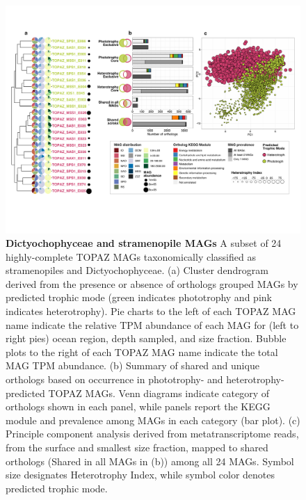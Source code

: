 \documentclass[12pt]{article}
\numberwithin{equation}{section}
\begin{document}
\begin{figure}[h!]    
    \centering
    \includegraphics[width = \columnwidth]{figures/Figure5-panel-plot-stramenopile-H.png}
    \caption{ \textbf{Dictyochophyceae and stramenopile MAGs} A subset of 24 highly-complete TOPAZ MAGs taxonomically classified as stramenopiles and Dictyochophyceae. (a) Cluster dendrogram derived from the presence or absence of orthologs grouped MAGs by predicted trophic mode (green indicates phototrophy and pink indicates heterotrophy). Pie charts to the left of each TOPAZ MAG name indicate the relative TPM abundance of each MAG for (left to right pies) ocean region, depth sampled, and size fraction. Bubble plots to the right of each TOPAZ MAG name indicate the total MAG TPM abundance. (b) Summary of shared and unique orthologs based on occurrence in phototrophy- and heterotrophy-predicted TOPAZ MAGs. Venn diagrams indicate category of orthologs shown in each panel, while panels report the KEGG module and prevalence among MAGs in each category (bar plot). (c) Principle component analysis derived from metatranscriptome reads, from the surface and smallest size fraction, mapped to shared orthologs (Shared in all MAGs in (b)) among all 24 MAGs. Symbol size designates Heterotrophy Index, while symbol color denotes predicted trophic mode. 
    }
    \label{fig:fig5-dicty}
\end{figure}
\end{document}
